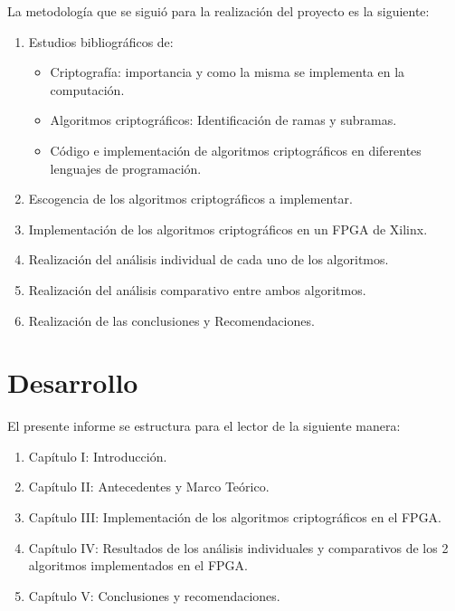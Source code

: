 La metodología que se siguió para la realización del proyecto es la siguiente:

\begin{enumerate}

\item Estudios bibliográficos de:

\begin{itemize}
	\item Criptografía: importancia y como la misma se implementa en la computación.
	\item Algoritmos criptográficos: Identificación de ramas y subramas.
	\item Código e implementación de algoritmos criptográficos en diferentes lenguajes de programación.
\end{itemize}

\item Escogencia de los algoritmos criptográficos a implementar.

\item Implementación de los algoritmos criptográficos en un FPGA de Xilinx.

\item Realización del análisis individual de cada uno de los algoritmos.

\item Realización del análisis comparativo entre ambos algoritmos.

\item Realización de las conclusiones y Recomendaciones.

\end{enumerate}

\section{Desarrollo}

El presente informe se estructura para el lector de la siguiente manera:

\begin{enumerate}
\item Capítulo I: Introducción.

\item Capítulo II: Antecedentes y Marco Teórico. 

\item Capítulo III: Implementación de los algoritmos criptográficos en el FPGA.

\item Capítulo IV: Resultados de los análisis individuales y comparativos de los 2 algoritmos implementados en el FPGA.

\item Capítulo V: Conclusiones y recomendaciones.

\end{enumerate}
